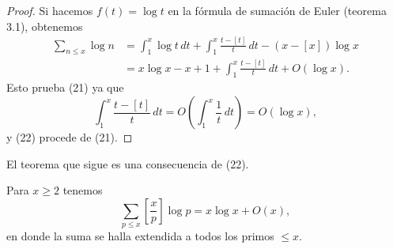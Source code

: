 \documentclass[12pt,a4paper]{book}
\begin{document}
    \begin{proof}
        Si hacemos $f(t)=\log t$ en la fórmula de sumación de Euler (teorema 3.1),
        obtenemos
        \begin{align*}
            \sum_{n\leq x}\log n&=\int_{1}^{x}\log t\,dt+\int_{1}^{x}\frac{t-[t]}{t}\,dt-(x-[x])\log x\\
            &=x\log x-x+1+\int_{1}^{x}\frac{t-[t]}{t}\,dt+O(\log x).
        \end{align*}
        Esto prueba (21) ya que
        \begin{equation*}
            \int_{1}^{x}\frac{t-[t]}{t}\,dt=O\left(\int_{1}^{x}\frac{1}{t}\,dt\right)=O(\log x),
        \end{equation*}
        y (22) procede de (21).
    \end{proof}

    El teorema que sigue es una consecuencia de (22).

    \begin{teorema}
        Para $x\geq2$ tenemos
        \begin{equation}
            \sum_{p\leq x}\left[\frac{x}{p}\right]\log p=x\log x+O(x),
        \end{equation}
        en donde la suma se halla extendida a todos los primos $\leq x$.
    \end{teorema}
\end{document}
